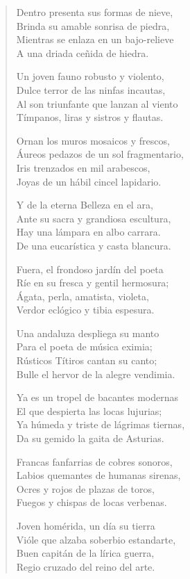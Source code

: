\documentclass[12pt]{article}
\begin{document}
\begin{verse}
Dentro presenta sus formas de nieve,\\
Brinda su amable sonrisa de piedra,\\
Mientras se enlaza en un bajo-relieve\\
A una driada ceñida de hiedra.  

Un joven fauno robusto y violento,\\
Dulce terror de las ninfas incautas,\\
Al son triunfante que lanzan al viento\\
Tímpanos, liras y sistros y flautas.  

Ornan los muros mosaicos y frescos,\\
Áureos pedazos de un sol fragmentario,\\
Iris trenzados en mil arabescos,\\
Joyas de un hábil cincel lapidario.  

Y de la eterna Belleza en el ara,\\
Ante su sacra y grandiosa escultura,\\
Hay una lámpara en albo carrara.\\
De una eucarística y casta blancura.  

Fuera, el frondoso jardín del poeta\\
Ríe en su fresca y gentil hermosura;\\
Ágata, perla, amatista, violeta,\\
Verdor eclógico y tibia espesura.  

Una andaluza despliega su manto\\
Para el poeta de música eximia;\\
Rústicos Títiros cantan su canto;\\
Bulle el hervor de la alegre vendimia.  

Ya es un tropel de bacantes modernas\\
El que despierta las locas lujurias;\\
Ya húmeda y triste de lágrimas tiernas,\\
Da su gemido la gaita de Asturias.  

Francas fanfarrias de cobres sonoros,\\
Labios quemantes de humanas sirenas,\\
Ocres y rojos de plazas de toros,\\
Fuegos y chispas de locas verbenas.  

Joven homérida, un día su tierra\\
Vióle que alzaba soberbio estandarte,\\
Buen capitán de la lírica guerra,\\
Regio cruzado del reino del arte.  


\end{verse}
\end{document}
